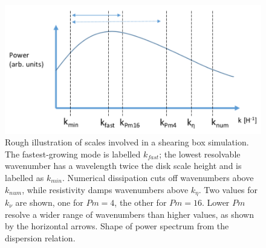 %
\begin{figure}[h]
  \begin{center}  
    \includegraphics [width=.9\textwidth, angle=0.]{img/kscales.pdf}
  \end{center}
  \caption{Rough illustration of scales involved in a shearing box simulation. The fastest-growing mode is labelled $k_{fast}$; the lowest resolvable wavenumber has a wavelength twice the disk scale height and is labelled as $k_{min}$. Numerical dissipation cuts off wavenumbers above $k_{num}$, while resistivity damps wavenumbers above $k_\eta$. Two values for $k_\nu$ are shown, one for $Pm=4$, the other for $Pm=16$. Lower $Pm$ resolve a wider range of wavenumbers than higher values, as shown by the horizontal arrows. Shape of power spectrum from the dispersion relation.}
  \label{fig:scales}
\end{figure}

